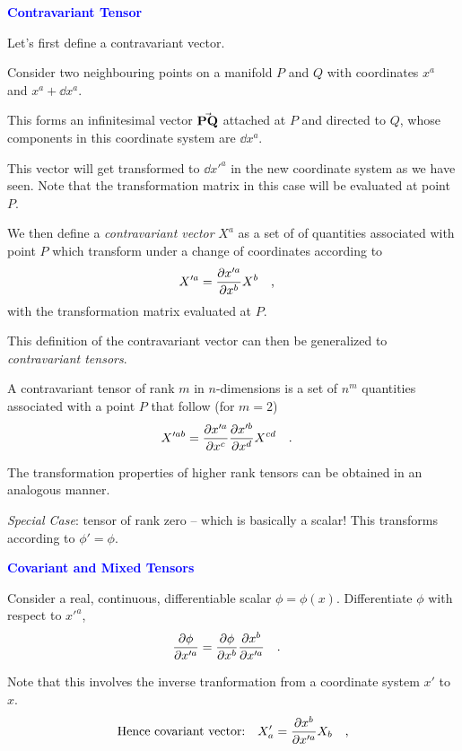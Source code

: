 \documentclass[landscape,aspectratio=169]{slides}
\begin{document}
\begin{slide}
	\textcolor{blue}{\textbf{Contravariant Tensor}}
	
	Let's first define a contravariant vector.
	
	Consider two neighbouring points on a manifold $ P $ and $ Q $ with coordinates $ x^a $ and $ x^a + \dd{x^a} $.
	
	This forms an infinitesimal vector $ \va{PQ} $ attached at $ P $ and directed to $ Q $, whose components in this coordinate system are $ \dd{x^a} $. 
	
	This vector will get transformed to $ \dd{x'^a} $ in the new coordinate system as we have seen. Note that the transformation matrix in this case will be evaluated at point $ P $.
\end{slide}

\begin{slide}
	We then define a \textit{contravariant vector} $ X^a $ as a set of of quantities associated with point $ P $ which transform under a change of coordinates according to
	\begin{equation}\label{key}
	X'^a = \pdv{x'^a}{x^b} X^b \qq{,}
	\end{equation}
	with the transformation matrix evaluated at $ P $.
	
	This definition of the contravariant vector can then be generalized to \textit{contravariant tensors}. 
\end{slide}

\begin{slide}

	A contravariant tensor of rank $ m $ in $ n $-dimensions is a set of $ n^m $ quantities associated with a point $ P $ that follow (for $ m=2 $)
	\begin{equation}\label{key}
	X'^{ab} =  \pdv{x'^a}{x^c}  \pdv{x'^b}{x^d} X^{cd} \qq{.}
	\end{equation}
	
	The transformation properties of higher rank tensors can be obtained in an analogous manner. 
	
	\textit{Special Case}: tensor of rank zero -- which is basically a scalar! This transforms according to $ \phi' = \phi $.
\end{slide}

\begin{slide}
	\textcolor{blue}{\textbf{Covariant and Mixed Tensors}}
	
	Consider a real, continuous, differentiable scalar $ \phi = \phi(x) $. Differentiate $ \phi $ with respect to $ x'^a $,
	\begin{equation}\label{key}
	\pdv{\phi}{x'^a} = \pdv{\phi}{x^b} \pdv{x^b}{x'^a} \qq{.}
	\end{equation}
	
	Note that this involves the inverse tranformation from a coordinate system $ x' $ to $ x $.
	\begin{equation}\label{key}
	 \qq{Hence covariant vector:}X'_a = \pdv{x^b}{x'^a} X_b \qq{,}
	\end{equation}
\end{slide}
\end{document}
